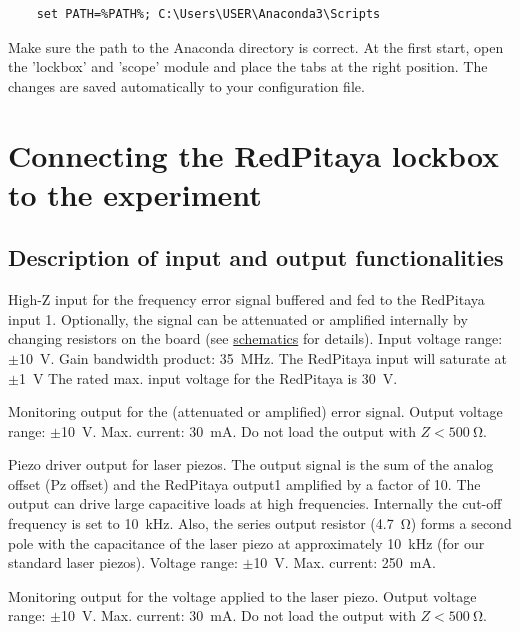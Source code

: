 \documentclass[twoside,a4paper]{refart}
\begin{document}
\begin{tcolorbox}
	\begin{verbatim}
	set PATH=%PATH%; C:\Users\USER\Anaconda3\Scripts
	\end{verbatim}
\end{tcolorbox}

Make sure the path to the Anaconda directory is correct. At the first start, open the 'lockbox' and 'scope' module and place the tabs at the right position. The changes are saved automatically to your configuration file.

\section{Connecting the RedPitaya lockbox to the experiment}

\subsection{Description of input and output functionalities}

High-Z input for the frequency error signal buffered and fed to the RedPitaya input 1. Optionally, the signal can be attenuated or amplified internally by changing resistors on the board (see \href{https://github.com/TU-Darmstadt-APQ/RedPitaya-Lockbox/tree/master/pcb}{schematics} for details). Input voltage range: $\pm$\qty{10}{\volt}. Gain bandwidth product: \qty{35}{\mega\hertz}. The RedPitaya input will saturate at $\pm$\qty{1}{\volt} The rated max. input voltage for the RedPitaya is \qty{30}{\volt}.

Monitoring output for the (attenuated or amplified) error signal. Output voltage range: $\pm$\qty{10}{\volt}. Max. current: \qty{30}{\milli\ampere}. Do not load the output with $Z < \qty{500}{\ohm}$.

Piezo driver output for laser piezos. The output signal is the sum of the analog offset (Pz offset) and the RedPitaya output1 amplified by a factor of 10. The output can drive large capacitive loads at high frequencies. Internally the cut-off frequency is set to \qty{10}{\kilo\hertz}. Also, the series output resistor (\qty{4,7}{\ohm}) forms a second pole with the capacitance of the laser piezo at approximately \qty{10}{\kilo\hertz} (for our standard laser piezos).  Voltage range: $\pm$\qty{10}{\volt}. Max. current: \qty{250}{\milli\ampere}.

Monitoring output for the voltage applied to the laser piezo. Output voltage range: $\pm$\qty{10}{\volt}. Max. current: \qty{30}{\milli\ampere}. Do not load the output with $Z < \qty{500}{\ohm}$.
\end{document}
